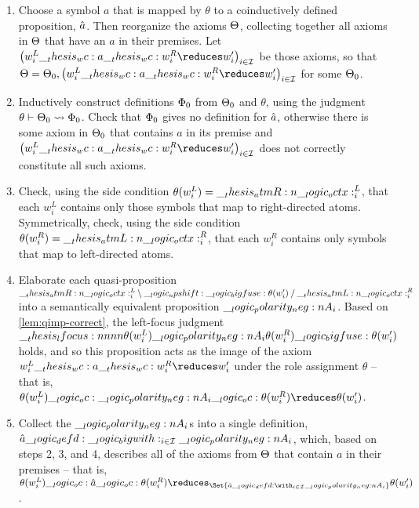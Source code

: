 \begin{enumerate}
\item
  Choose a symbol $a$ that is mapped by $\theta$ to a coinductively defined proposition, $\hat{a}$.
  Then reorganize the axioms $\Theta$, collecting together all axioms in $\Theta$ that have an $a$ in their premises.
  Let $\bigl(w^L_i \wc a \wc w^R_i \reduces w'_i\bigr)_{i \in \mathcal{I}}$ be those axioms, so that $\srsig = \srsig_0 , \bigl(w^L_i \wc a \wc w^R_i \reduces w'_i\bigr)_{i \in \mathcal{I}}$ for some $\Theta_0$.
\item
  Inductively construct definitions $\Phi_0$ from $\Theta_0$ and $\theta$, using the judgment $\theta \vdash \Theta_0 \rightsquigarrow \Phi_0$.
  Check that $\Phi_0$ gives no definition for $\hat{a}$, otherwise there is some axiom in $\Theta_0$ that contains $a$ in its premise and $\bigl(w^L_i \wc a \wc w^R_i \reduces w'_i\bigr)_{i \in \mathcal{I}}$ does not correctly constitute all such axioms.
\item
  Check, using the side condition $\theta(w^L_i) = \__thesis_atmR:n {\__logic_octx:}^L_i$, that each $w^L_i$ contains only those symbols that map to right-directed atoms.
  Symmetrically, check, using the side condition $\theta(w^R_i) = \__thesis_atmL:n {\__logic_octx:}^R_i$, that each $w^R_i$ contains only symbols that map to left-directed atoms.
\item
  Elaborate each quasi-proposition $\__thesis_atmR:n {\__logic_octx:}^L_i \mathbin { \setminus } \__logic_upshift: \__logic_bigfuse: \theta(w'_i) \mathbin { / } \__thesis_atmL:n {\__logic_octx:}^R_i$ into a semantically equivalent proposition $\__logic_polarity_neg:n {A}_i$.
  Based on \cref{lem:qimp-correct}, the left-focus judgment $\__thesis_lfocus:nnnn {\theta(w^L_i)} {\__logic_polarity_neg:n {A}_i} {\theta(w^R_i)} {\__logic_bigfuse: \theta(w'_i)}$ holds, and so this proposition acts as the image of the axiom $w^L_i \wc a \wc w^R_i \reduces w'_i$ under the role assignment $\theta$ -- that is, $\theta(w^L_i) \oc \n{A}_i \oc \theta(w^R_i) \reduces \theta(w'_i)$.
\item
  Collect the $\__logic_polarity_neg:n {A}_i$s into a single definition, $\hat{a} \__logic_defd: \__logic_bigwith:_{i \in \mathcal{I}} \__logic_polarity_neg:n {A}_i$, which, based on steps 2, 3, and 4, describes all of the axioms from $\Theta$ that contain $a$ in their premises -- that is, $\theta(w^L_i) \oc \defp{a} \oc \theta(w^R_i) \reduces_{\Set{\defp{a} \defd \with_{i \in \mathcal{I}} \n{A}_i}} \theta(w'_i)$.
\end{enumerate}

